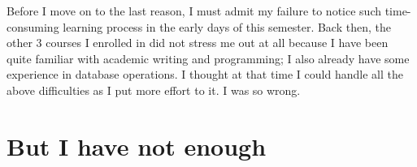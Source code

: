 \documentclass[12pt,a4paper]{article}
\begin{document}
Before I move on to the last reason, I must admit my failure to notice such time-consuming learning process in the early days of this semester. Back then, the other 3 courses I enrolled in did not stress me out at all because I have been quite familiar with academic writing and programming; I also already have some experience in database operations. I thought at that time I could handle all the above difficulties as I put more effort to it. I was so wrong.



\section{But I have not enough}
\end{document}

